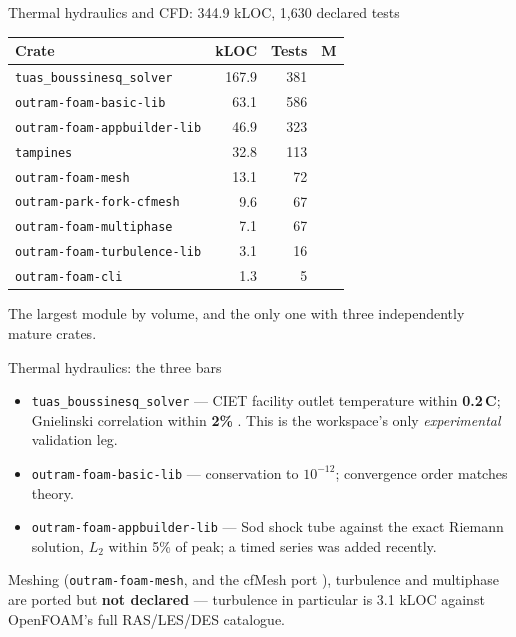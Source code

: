 \documentclass[aspectratio=169]{beamer}
\newcommand{\statustab}[1]{{\footnotesize\setlength{\tabcolsep}{4pt}#1}}
\begin{document}
\begin{frame}{Thermal hydraulics and CFD: 344.9 kLOC, 1{,}630 declared tests}
    \statustab{
    \begin{tabular}{lrrc}
        \toprule
        \textbf{Crate} & \textbf{kLOC} & \textbf{Tests} & \textbf{M} \\
        \midrule
        \texttt{tuas\_boussinesq\_solver}      & 167.9 & 381 & \checkmark \\
        \texttt{outram-foam-basic-lib}         &  63.1 & 586 & \checkmark \\
        \texttt{outram-foam-appbuilder-lib}    &  46.9 & 323 & \checkmark \\
        \texttt{tampines}                      &  32.8 & 113 & \\
        \texttt{outram-foam-mesh}              &  13.1 &  72 & \\
        \texttt{outram-park-fork-cfmesh}       &   9.6 &  67 & \\
        \texttt{outram-foam-multiphase}        &   7.1 &  67 & \\
        \texttt{outram-foam-turbulence-lib}    &   3.1 &  16 & \\
        \texttt{outram-foam-cli}               &   1.3 &   5 & \\
        \bottomrule
    \end{tabular}}

    \medskip
    The largest module by volume, and the only one with three independently
    mature crates.
\end{frame}

\begin{frame}{Thermal hydraulics: the three bars}
    \begin{itemize}
        \item \texttt{tuas\_boussinesq\_solver} --- CIET facility outlet
              temperature within \textbf{0.2\,\textdegree C}; Gnielinski
              correlation within \textbf{2\%}
              \parencite{gnielinski1976new,zweibaum2015experimental}. This is
              the workspace's only \emph{experimental} validation leg.
        \item \texttt{outram-foam-basic-lib} --- conservation to
              $10^{-12}$; convergence order matches theory.
        \item \texttt{outram-foam-appbuilder-lib} --- Sod shock tube
              \parencite{sod1978survey} against the exact Riemann solution,
              $L_2$ within 5\% of peak; a timed series was added recently.
    \end{itemize}

    \medskip
    Meshing (\texttt{outram-foam-mesh}, and the cfMesh port
    \parencite{juretic2015cfmesh}), turbulence and multiphase are ported but
    \textbf{not declared} --- turbulence in particular is 3.1 kLOC against
    OpenFOAM's full RAS/LES/DES catalogue.
\end{frame}
\end{document}
